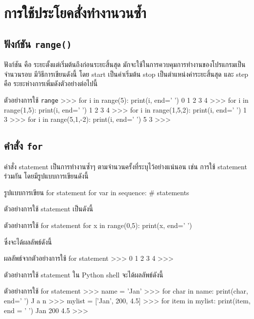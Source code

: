 \chapter{การใช้ประโยคสั่งทำงานวนซ้ำ}
\section{ฟังก์ชัน \texttt{range()}}

ฟังก์ชัน   คือ ระยะตั้งแต่เริ่มต้นถึงก่อนระยะสิ้นสุด มักจะใช้ในการควบคุมการทำงานของโปรแกรมเป็นจำนวนรอบ มีวิธีการเขียนดังนี้   โดย start เป็นค่าเริ่มต้น stop เป็นตำแหน่งค่าระยะสิ้นสุด และ step คือ ระยะห่างการเพิ่มดังตัวอย่างต่อไปนี้

\begin{codelist}{ตัวอย่างการใช้ \texttt{range}}{}
>>> for i in range(5): print(i, end=' ')
0 1 2 3 4 
>>> for i in range(1,5): print(i, end=' ')
1 2 3 4 
>>> for i in range(1,5,2): print(i, end=' ')
1 3 
>>> for i in range(5,1,-2): print(i, end=' ')
5 3 
>>> 
\end{codelist}

\section{คำสั่ง \texttt{for}}

คำสั่ง   statement เป็นการทำงานซ้ำๆ ตามจำนวนครั้งที่ระบุไว้อย่างแน่นอน เช่น การใช้   statement ร่วมกัน   โดยมีรูปแบบการเขียนดังนี้

\begin{codelist}{รูปแบบการเขียน for statement}{}
for var in sequence:
    # statements
\end{codelist}

ตัวอย่างการใช้   statement เป็นดังนี้

\begin{codelist}{ตัวอย่างการใช้ for statement}{}
for x in range(0,5): print(x, end=' ')
\end{codelist}

ซึ่งจะได้ผลลัพธ์ดังนี้

\begin{codelist}{ผลลัพธ์จากตัวอย่างการใช้ for statement}{}
>>>
0 1 2 3 4
>>>
\end{codelist}

ตัวอย่างการใช้   statement ใน Python shell จะได้ผลลัพธ์ดังนี้

\begin{codelist}{ตัวอย่างการใช้ for statement}{}
>>> name = 'Jan'
>>> for char in name: print(char, end=' ')
J a n 
>>> mylist = ['Jan', 200, 4.5]
>>> for item in mylist: print(item, end = ' ')
Jan 200 4.5 
>>> 
\end{codelist}

